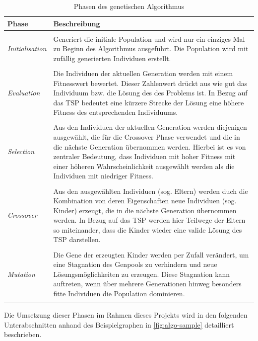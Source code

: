 \documentclass[12pt,a4paper]{scrreprt}
\begin{document}
\begin{center}
\begin{longtable}{p{3.0cm} p{10cm}}

Phase & Beschreibung \\
\hline \\
\textit{Initialisation} & Generiert die initiale Population und wird nur ein einziges Mal zu Beginn des Algorithmus ausgeführt. Die Population wird mit zufällig generierten Individuen erstellt.\\
 & \\
\textit{Evaluation} &  Die Individuen der aktuellen Generation werden mit einem Fitnesswert bewertet. Dieser Zahlenwert drückt aus wie gut das Individuum bzw. die Lösung des des Problems ist. In Bezug auf das TSP bedeutet eine kürzere Strecke der Lösung eine höhere Fitness des entsprechenden Individuums.\\
 & \\
\textit{Selection} & Aus den Individuen der aktuellen Generation werden diejenigen ausgewählt, die für die Crossover Phase verwendet und die in die nächste Generation übernommen werden. Hierbei ist es von zentraler Bedeutung, dass Individuen mit hoher Fitness mit einer höheren Wahrscheinlichkeit ausgewählt werden als die Individuen mit niedriger Fitness.\\
 & \\
\textit{Crossover} & Aus den ausgewählten Individuen (sog. Eltern) werden duch die Kombination von deren Eigenschaften neue Individuen (sog. Kinder) erzeugt, die in die nächste Generation übernommen werden. In Bezug auf das TSP werden hier Teilwege der Eltern so miteinander, dass die Kinder wieder eine valide Lösung des TSP darstellen.\\
 & \\
\textit{Mutation} & Die Gene der erzeugten Kinder werden per Zufall verändert, um eine Stagnation des Genpools zu verhindern und neue Lösungsmöglichkeiten zu erzeugen. Diese Stagnation kann auftreten, wenn über mehrere Generationen hinweg besonders fitte Individuen die Population dominieren.\\

\caption{Phasen des genetischen Algorithmus}
\label{tbl:phasen-algorithmus}
\end{longtable}
\end{center}

Die Umsetzung dieser Phasen im Rahmen dieses Projekts wird in den folgenden Unterabschnitten anhand des Beispielgraphen in \autoref{fig:algo-sample} detailliert beschrieben.
\end{document}
